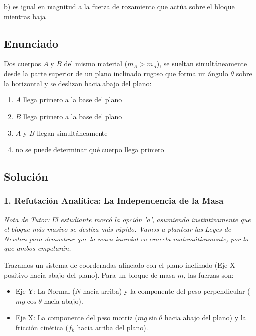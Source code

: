 \documentclass[12pt, a4paper]{article}
\begin{document}
\begin{tcolorbox}[colback=green!5!white, colframe=green!50!black, title=Respuesta Final]
\centering \Large b) es igual en magnitud a la fuerza de rozamiento que actúa sobre el bloque mientras baja
\end{tcolorbox}

\newpage

\subsection*{Enunciado}
Dos cuerpos $A$ y $B$ del mismo material ($m_A > m_B$), se sueltan simultáneamente desde la parte superior de un plano inclinado rugoso que forma un ángulo $\theta$ sobre la horizontal y se deslizan hacia abajo del plano:
\begin{enumerate}[label=\alph*)]
    \item $A$ llega primero a la base del plano
    \item $B$ llega primero a la base del plano
    \item $A$ y $B$ llegan simultáneamente
    \item no se puede determinar qué cuerpo llega primero
\end{enumerate}

\subsection*{Solución}

\subsubsection*{1. Refutación Analítica: La Independencia de la Masa}
\textit{Nota de Tutor: El estudiante marcó la opción 'a', asumiendo instintivamente que el bloque más masivo se desliza más rápido. Vamos a plantear las Leyes de Newton para demostrar que la masa inercial se cancela matemáticamente, por lo que ambos empatarán.}

Trazamos un sistema de coordenadas alineado con el plano inclinado (Eje X positivo hacia abajo del plano). Para un bloque de masa $m$, las fuerzas son:
\begin{itemize}
    \item Eje Y: La Normal ($N$ hacia arriba) y la componente del peso perpendicular ($mg \cos\theta$ hacia abajo).
    \item Eje X: La componente del peso motriz ($mg \sin\theta$ hacia abajo del plano) y la fricción cinética ($f_k$ hacia arriba del plano).
\end{itemize}
\end{document}
